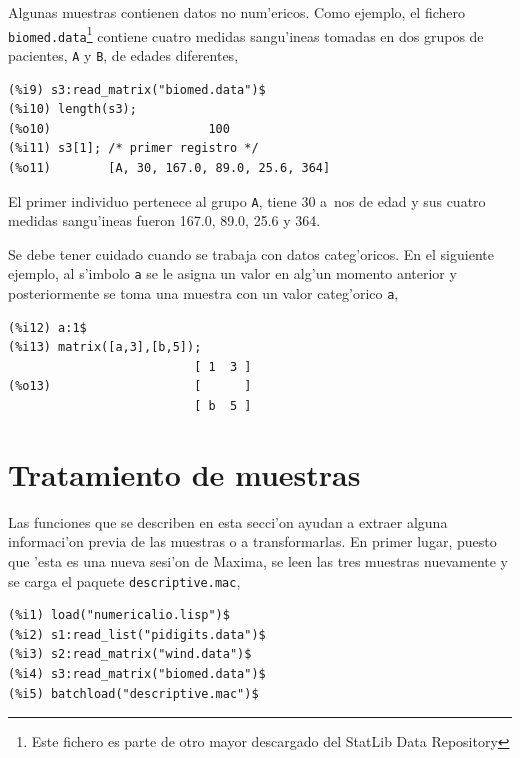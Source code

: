 \documentclass[spanish,12pt,a4paper]{article}
\begin{document}
Algunas muestras contienen datos no num'ericos. Como ejemplo, el fichero \verb|biomed.data|\footnote{Este fichero es parte de otro mayor descargado del StatLib Data Repository} contiene cuatro medidas sangu'ineas tomadas en dos grupos de pacientes, \verb|A| y \verb|B|, de edades diferentes,
\begin{verbatim}
(%i9) s3:read_matrix("biomed.data")$
(%i10) length(s3);
(%o10)                      100
(%i11) s3[1]; /* primer registro */
(%o11)        [A, 30, 167.0, 89.0, 25.6, 364]
\end{verbatim}
El primer individuo pertenece al grupo \verb|A|, tiene 30 a~nos de edad y sus cuatro medidas sangu'ineas fueron 167.0, 89.0, 25.6 y 364.

Se debe tener cuidado cuando se trabaja con datos categ'oricos. En el siguiente ejemplo, al s'imbolo \verb|a| se le asigna un valor en alg'un momento anterior y posteriormente se toma una muestra con un valor categ'orico \verb|a|,
\begin{verbatim}
(%i12) a:1$
(%i13) matrix([a,3],[b,5]);
                          [ 1  3 ]
(%o13)                    [      ]
                          [ b  5 ]
\end{verbatim}


\section{Tratamiento de muestras}

Las funciones que se describen en esta secci'on ayudan a extraer alguna informaci'on previa de las muestras o a transformarlas. En primer lugar, puesto que 'esta es una nueva sesi'on de Maxima, se leen las tres muestras nuevamente y se carga el paquete \verb|descriptive.mac|,
\begin{verbatim}
(%i1) load("numericalio.lisp")$
(%i2) s1:read_list("pidigits.data")$
(%i3) s2:read_matrix("wind.data")$
(%i4) s3:read_matrix("biomed.data")$
(%i5) batchload("descriptive.mac")$
\end{verbatim}
\end{document}
